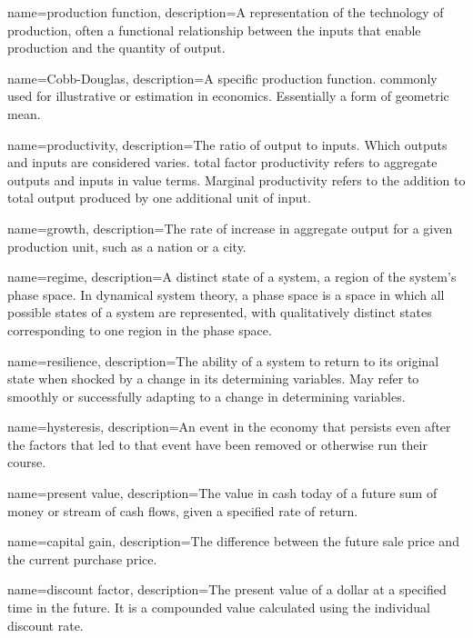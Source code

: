 {
name=production function,
description={A representation of the technology of production, often a functional relationship between the \glspl{input} that enable production and the quantity of \gls{output}.}
}

{
name=Cobb-Douglas,
description={A specific production function. commonly used for illustrative or estimation in economics. Essentially a form of geometric mean.}
}

{
name=productivity,
description={The ratio of \gls{output} to \glspl{input}. Which outputs and inputs are considered varies. \gls{total factor productivity} refers to aggregate outputs and inputs in value terms. Marginal productivity refers to the addition to total output produced by one additional unit of input.} 
}

{
name=growth,
description={The rate of increase in aggregate \gls{output} for a given production unit, such as a nation  or a city.}
}

{
name=regime,
description={A distinct state of a system, a region of the system's phase space. In dynamical system theory, a phase space is a space in which all possible states of a system are represented, with qualitatively distinct  states corresponding to one region in the phase space.}
}

{
name=resilience,
description={The ability of a system to return to its original state when shocked by a change in its determining variables. May refer to smoothly or successfully adapting to a change in  determining variables.}
}

{
name=hysteresis,
description={An event in the economy that persists even after the factors that led to that event have been removed or otherwise run their course.}
}

{
name=present value,
description={The value in cash today of a future sum of money or stream of cash flows, given a specified rate of return.}
}

{
name=capital gain,
description={The difference between the future sale price and the current purchase price.}
}

{
name=discount factor,
description={The present value of a dollar at a specified time in the future. It is a compounded value calculated using the individual discount rate.}
}

